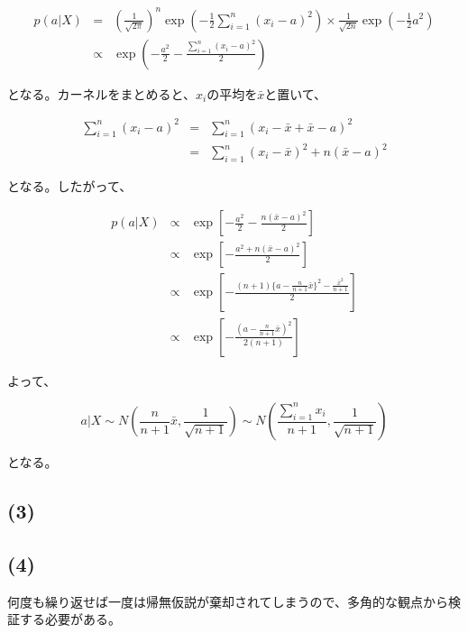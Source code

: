 \documentclass[a4j,xelatex,ja=standard,jafont=hiragino-pron, 9pt]{bxjsarticle}
\begin{document}
\begin{eqnarray}
  p(a|X)
  &=& \left(\frac{1}{\sqrt{2\pi}}\right)^n
    \exp \left(-\frac{1}{2} \sum_{i=1}^n (x_i - a)^2\right)
    \times \frac{1}{\sqrt{2n}} \exp \left(- \frac{1}{2} a^2\right) \nonumber \\
  &\propto& \exp \left(- \frac{a^2}{2} - \frac{\sum_{i=1}^n (x_i - a)^2}{2}\right)
\end{eqnarray}

となる。カーネルをまとめると、$x_i$の平均を$\bar{x}$と置いて、

\begin{eqnarray}
  \sum_{i=1}^n(x_i - a)^2
  &=& \sum_{i=1}^n (x_i - \bar{x} + \bar{x} - a)^2 \nonumber \\
  &=& \sum_{i=1}^n (x_i - \bar{x})^2 + n(\bar{x} - a)^2
\end{eqnarray}

となる。したがって、

\begin{eqnarray}
  p(a|X)
  &\propto& \exp \left[- \frac{a^2}{2} - \frac{n(\bar{x} - a)^2}{2}\right] \nonumber \\
  &\propto& \exp \left[- \frac{a^2 + n(\bar{x} - a)^2}{2} \right] \nonumber \\
  &\propto& \exp
    \left[- \frac{
      (n + 1) \{ a - \frac{n}{n+1}\bar{x} \}^2 - \frac{\bar{x}^2}{n+1}
    }{2}
    \right] \nonumber \\
  &\propto& \exp \left[ - \frac{(a - \frac{n}{n+1}\bar{x})^2}{2(n+1)}\right]
\end{eqnarray}

よって、

\begin{equation}
  a|X \sim N\left(\frac{n}{n+1}\bar{x}, \frac{1}{\sqrt{n+1}}\right) \sim N\left(\frac{\sum_{i=1}^n x_i}{n+1}, \frac{1}{\sqrt{n+1}}\right)
\end{equation}

となる。

\subsection*{(3)}

\subsection*{(4)}

何度も繰り返せば一度は帰無仮説が棄却されてしまうので、多角的な観点から検証する必要がある。
\end{document}
